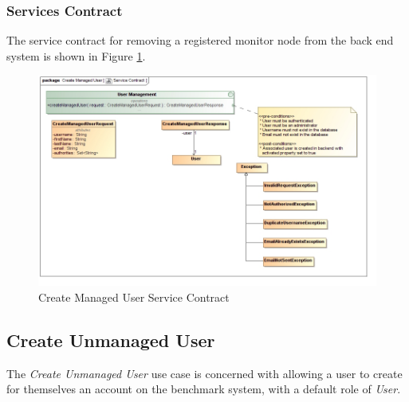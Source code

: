 \subsubsection{Services Contract}
The service contract for removing a registered monitor node from the back end 
system is shown in Figure \ref{fig:createManagedUserServicesContract}.
\begin{figure}[H]
	\begin{center}
		\includegraphics[scale=0.4]{../Diagrams and Charts/User Management/Create Managed User Service Contract.jpg}
		\caption{Create Managed User Service Contract}
		\label{fig:createManagedUserServicesContract}
	\end{center}
\end{figure}



\subsection{Create Unmanaged User}
The \textit{Create Unmanaged User} use case is concerned with allowing a user to
create for themselves an account on the benchmark system, with a default role
of \textit{User}.

